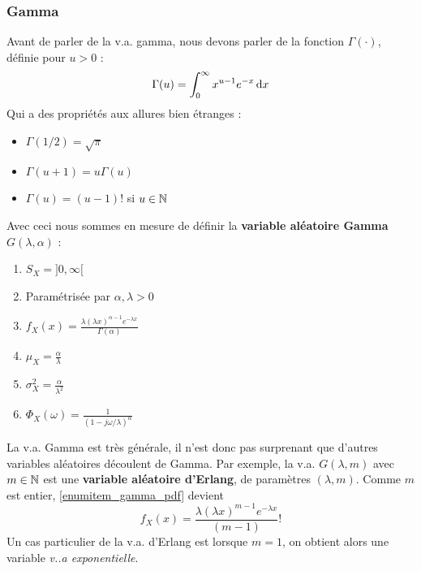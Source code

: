\documentclass[11pt,a4paper]{article}
\numberwithin{equation}{section}
\begin{document}
\subsubsection{Gamma}
Avant de parler de la v.a. gamma, nous devons parler de la fonction $\Gamma(\cdot)$, définie pour $u > 0$ :
\begin{equation}
    \Gamma(u) = \int_0^\infty x^{u-1} e^{-x} \, \mathrm d x
\end{equation}
Qui a des propriétés aux allures bien étranges :
\begin{multicols}{3}
    \begin{itemize}
        \item $\Gamma(1/2) = \sqrt{\pi}$
        \item $\Gamma(u + 1) = u\Gamma(u)$
        \item $\Gamma(u) = (u-1)!$ si $u \in \mathbb{N}$
    \end{itemize}
\end{multicols}
Avec ceci nous sommes en mesure de définir la \textbf{variable aléatoire Gamma} $G(\lambda, \alpha)$ :
\begin{multicols}{2}
    \begin{enumerate}[label=P\arabic*.]
        \item $S_X = ]0,\infty[$
        \item Paramétrisée par $\alpha,\lambda > 0$
        \item \label{enumitem_gamma_pdf}$f_X(x) = \frac{\lambda(\lambda x)^{\alpha -1} e^{-\lambda x}}{\Gamma(\alpha)}$
        \item $\mu_X = \frac{\alpha}{\lambda}$
        \item $\sigma_X^2 = \frac{\alpha}{\lambda^2}$
        \item $\Phi_X(\omega) = \frac{1}{(1-j\omega/\lambda)^\alpha}$
\end{enumerate}
\end{multicols}
La v.a. Gamma est très générale, il n'est donc pas surprenant que d'autres variables aléatoires découlent de Gamma. Par exemple, la v.a. $G(\lambda, m)$ avec $m \in \mathbb{N}$ est une \textbf{variable aléatoire d'Erlang}, de paramètres $(\lambda, m)$. Comme $m$ est entier, \ref{enumitem_gamma_pdf} devient 
\begin{equation}
    f_X(x) = \frac{\lambda(\lambda x)^{m-1} e^{-\lambda x}}{(m-1)}!
\end{equation}
Un cas particulier de la v.a. d'Erlang est lorsque $m = 1$, on obtient alors une variable \textit{v..a exponentielle}. 
\end{document}
